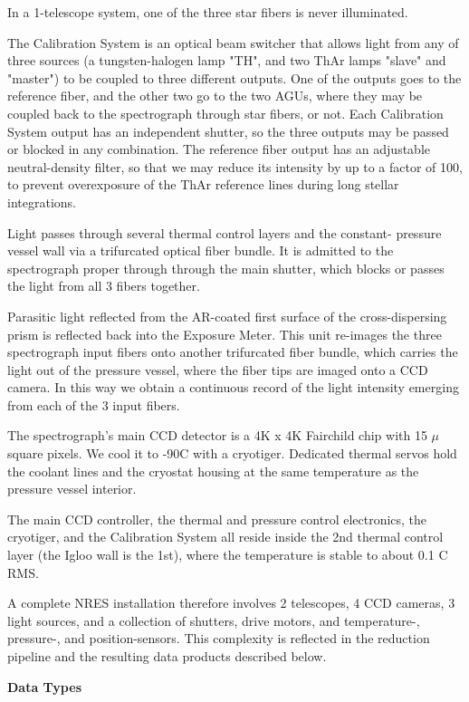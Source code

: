 In a 1-telescope system, one of the three star fibers is never illuminated.

The Calibration System is an optical beam switcher that allows 
light from any of three sources (a tungsten-halogen lamp "TH", and two
ThAr lamps "slave" and "master") to be coupled to three different outputs.  
One of
the outputs goes to the reference fiber, and the other two go to the two
AGUs, where they may be coupled back to the spectrograph through star fibers,
or not.
Each Calibration System output has an independent shutter, so the three 
outputs may be passed or blocked in any combination.
The reference fiber output has an adjustable neutral-density filter, so that
we may reduce its intensity by up to a factor of 100, to prevent
overexposure of the ThAr reference lines during long stellar integrations.

Light passes through several thermal control layers and the constant-
pressure vessel wall via a trifurcated optical fiber bundle.
It is admitted to the spectrograph proper through through the main shutter,
which blocks or passes the light from all 3 fibers together.

Parasitic light reflected from the AR-coated first surface of the 
cross-dispersing prism is reflected back into the Exposure Meter.
This unit re-images the three spectrograph input fibers onto
another trifurcated fiber bundle, which carries the light out of the
pressure vessel, where the fiber tips are imaged onto a CCD camera.
In this way we obtain a continuous record of the light intensity emerging
from each of the 3 input fibers.

The spectrograph's main CCD detector is a 4K x 4K Fairchild chip with 15 $\mu$
square pixels.  We cool it to -90C with a cryotiger.  Dedicated thermal servos
hold the coolant lines and the cryostat housing at the same temperature as
the pressure vessel interior.

The main CCD controller, the thermal and pressure control electronics,
the cryotiger, and the Calibration System all reside inside the 2nd thermal
control layer (the Igloo wall is the 1st), where the temperature is stable
to about 0.1 C RMS.

A complete NRES installation therefore involves 2 telescopes, 4 CCD cameras,
3 light sources, and a collection of shutters, drive motors, and temperature-,
pressure-, and position-sensors.  This complexity is reflected in the
reduction pipeline and the resulting data products described below.

\vskip12pt
\parindent=0pt
{\bf{Data Types}}
\vskip8pt
\parindent20pt

